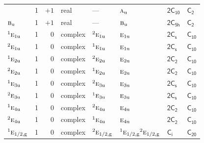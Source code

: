 \documentclass[10pt,a4paper]{article}
\makeatletter
\def\grouprule#1#2{\noalign{\marks\LTgroupmarks{\the\belowrulesep}\nobreak\vskip#1%
  \vskip\aboverulesep}\multispan\LT@cols\unskip{\leaders\hrule\@height#2\hfill\kern\z@}\cr
  \noalign{\penalty\LTrulebreak\vskip\belowrulesep\global\@lastruleclass\z@}}
\numberwithin{equation}{section}
\newcommand{\grp}[1]{\mathsf{#1}}
\newcommand{\irr}[1]{\text{\normalfont\scshape #1}}
\newcommand{\conjpair}[1]{{}^{#1}}
\newcommand{\detbox}[1]{{\setlength{\fboxsep}{1pt}\fbox{#1}}}
\newcommand{\ptag}[1]{\mathrm{#1}}
\makeatother
\begin{document}
{\begin{longtable}{@{}lrrlllll@{}}
\detbox{$\irr{a}_{\ptag{u}}$} & 1 & $+1$ & real & --- & $\irr{a}_{\ptag{u}}$ & \href{2C10.pdf}{$\grp{2C_{10}}$} & \href{../../../rotation/data/pdf/C2.pdf}{$\grp{C_{2}}$}\\
$\irr{b}_{\ptag{u}}$ & 1 & $+1$ & real & --- & $\irr{b}_{\ptag{u}}$ & \href{2C5h.pdf}{$\grp{2C_{5h}}$} & \href{../../../rotation/data/pdf/C2.pdf}{$\grp{C_{2}}$}\\
$\conjpair{1}\irr{e}_{1\ptag{u}}$ & 1 & $0$ & complex & $\conjpair{2}\irr{e}_{1\ptag{u}}$ & $\irr{e}_{1\ptag{u}}$ & \href{2C1v.pdf}{$\grp{2C_{s}}$} & \href{../../../rotation/data/pdf/C10.pdf}{$\grp{C_{10}}$}\\
$\conjpair{2}\irr{e}_{1\ptag{u}}$ & 1 & $0$ & complex & $\conjpair{1}\irr{e}_{1\ptag{u}}$ & $\irr{e}_{1\ptag{u}}$ & \href{2C1v.pdf}{$\grp{2C_{s}}$} & \href{../../../rotation/data/pdf/C10.pdf}{$\grp{C_{10}}$}\\
$\conjpair{1}\irr{e}_{2\ptag{u}}$ & 1 & $0$ & complex & $\conjpair{2}\irr{e}_{2\ptag{u}}$ & $\irr{e}_{2\ptag{u}}$ & \href{2C2.pdf}{$\grp{2C_{2}}$} & \href{../../../rotation/data/pdf/C10.pdf}{$\grp{C_{10}}$}\\
$\conjpair{2}\irr{e}_{2\ptag{u}}$ & 1 & $0$ & complex & $\conjpair{1}\irr{e}_{2\ptag{u}}$ & $\irr{e}_{2\ptag{u}}$ & \href{2C2.pdf}{$\grp{2C_{2}}$} & \href{../../../rotation/data/pdf/C10.pdf}{$\grp{C_{10}}$}\\
$\conjpair{1}\irr{e}_{3\ptag{u}}$ & 1 & $0$ & complex & $\conjpair{2}\irr{e}_{3\ptag{u}}$ & $\irr{e}_{3\ptag{u}}$ & \href{2C1v.pdf}{$\grp{2C_{s}}$} & \href{../../../rotation/data/pdf/C10.pdf}{$\grp{C_{10}}$}\\
$\conjpair{2}\irr{e}_{3\ptag{u}}$ & 1 & $0$ & complex & $\conjpair{1}\irr{e}_{3\ptag{u}}$ & $\irr{e}_{3\ptag{u}}$ & \href{2C1v.pdf}{$\grp{2C_{s}}$} & \href{../../../rotation/data/pdf/C10.pdf}{$\grp{C_{10}}$}\\
$\conjpair{1}\irr{e}_{4\ptag{u}}$ & 1 & $0$ & complex & $\conjpair{2}\irr{e}_{4\ptag{u}}$ & $\irr{e}_{4\ptag{u}}$ & \href{2C2.pdf}{$\grp{2C_{2}}$} & \href{../../../rotation/data/pdf/C10.pdf}{$\grp{C_{10}}$}\\
$\conjpair{2}\irr{e}_{4\ptag{u}}$ & 1 & $0$ & complex & $\conjpair{1}\irr{e}_{4\ptag{u}}$ & $\irr{e}_{4\ptag{u}}$ & \href{2C2.pdf}{$\grp{2C_{2}}$} & \href{../../../rotation/data/pdf/C10.pdf}{$\grp{C_{10}}$}\\
\grouprule{0pt}{\lightrulewidth}
$\conjpair{1}\irr{e}_{1/2,\ptag{g}}$ & 1 & $0$ & complex & $\conjpair{2}\irr{e}_{1/2,\ptag{g}}$ & $\conjpair{1}\irr{e}_{1/2,\ptag{g}}\conjpair{2}\irr{e}_{1/2,\ptag{g}}$ & \href{S2.pdf}{$\grp{C_{i}}$} & $\grp{C_{20}}$\\

\end{longtable}}
\end{document}
